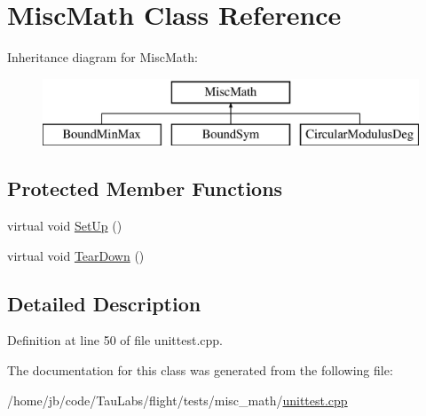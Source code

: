 \hypertarget{class_misc_math}{\section{\-Misc\-Math \-Class \-Reference}
\label{class_misc_math}
}
\-Inheritance diagram for \-Misc\-Math\-:\begin{figure}[H]
\begin{center}
\leavevmode
\includegraphics[height=2.000000cm]{class_misc_math}
\end{center}
\end{figure}
\subsection*{\-Protected \-Member \-Functions}
\begin{DoxyCompactItemize}
\item 
virtual void \hyperlink{group___unit_tests_gaf32e95ea690177429881d65ee89a43e2}{\-Set\-Up} ()
\item 
virtual void \hyperlink{group___unit_tests_gaee049bdfbeb6e7117415c472da634038}{\-Tear\-Down} ()
\end{DoxyCompactItemize}


\subsection{\-Detailed \-Description}


\-Definition at line 50 of file unittest.\-cpp.



\-The documentation for this class was generated from the following file\-:\begin{DoxyCompactItemize}
\item 
/home/jb/code/\-Tau\-Labs/flight/tests/misc\-\_\-math/\hyperlink{misc__math_2unittest_8cpp}{unittest.\-cpp}\end{DoxyCompactItemize}
